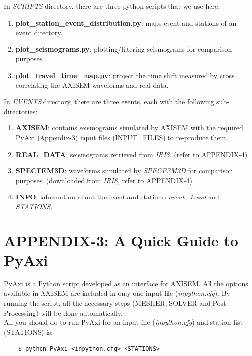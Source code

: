 \documentclass{article}
\begin{document}
In \textit{SCRIPTS} directory, there are three python scripts that we use here:

\begin{enumerate}
    \item \textbf{plot\_station\_event\_distribution.py}: maps event and stations of an
    event directory.
    \item \textbf{plot\_seismograms.py}: plotting/filtering seismograms for comparison purposes.
    \item \textbf{plot\_travel\_time\_map.py}: project the time shift measured by cross
    correlating the AXISEM waveforms and real data.
\end{enumerate}

In \textit{EVENTS} directory, there are three events, each with the following
sub-directories:

\begin{enumerate}
    \item \textbf{AXISEM}: contains seismograms simulated by AXISEM with
    the required PyAxi (Appendix-3) input files (INPUT\_FILES) to re-produce them.
    \item \textbf{REAL\_DATA}: seismograms retrieved from \textit{IRIS. }(refer to
    APPENDIX-4)
    \item \textbf{SPECFEM3D}: waveforms simulated by \textit{SPECFEM3D} for comparison purposes. (downloaded from\textit{ IRIS}, refer to APPENDIX-4)
    \item \textbf{INFO}: information about the event and stations: \textit{event\_1.xml} and
    \textit{STATIONS}.
\end{enumerate}


\newpage
\section{APPENDIX-3: A Quick Guide to PyAxi}

PyAxi is a Python script developed as an interface for AXISEM. All the options
available in AXISEM are included in only one input file (\textit{inpython.cfg}). By running
the script, all the necessary steps (MESHER, SOLVER and Post-Processing) will be
done automatically. \\

All you should do to run PyAxi for an input file (\textit{inpython.cfg}) and station list
(STATIONS) is:
\begin{verbatim}
    $ python PyAxi <inpython.cfg> <STATIONS>
\end{verbatim}
\end{document}
